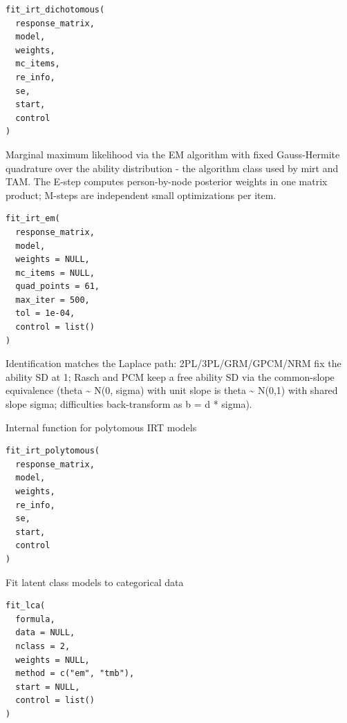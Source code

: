 \documentclass[a4paper]{book}
\begin{document}
%
\begin{Usage}
\begin{verbatim}
fit_irt_dichotomous(
  response_matrix,
  model,
  weights,
  mc_items,
  re_info,
  se,
  start,
  control
)
\end{verbatim}
\end{Usage}
%
\begin{Description}
Marginal maximum likelihood via the EM algorithm with fixed Gauss-Hermite
quadrature over the ability distribution - the algorithm class used by
mirt and TAM. The E-step computes person-by-node posterior weights in one
matrix product; M-steps are independent small optimizations per item.
\end{Description}
%
\begin{Usage}
\begin{verbatim}
fit_irt_em(
  response_matrix,
  model,
  weights = NULL,
  mc_items = NULL,
  quad_points = 61,
  max_iter = 500,
  tol = 1e-04,
  control = list()
)
\end{verbatim}
\end{Usage}
%
\begin{Details}
Identification matches the Laplace path: 2PL/3PL/GRM/GPCM/NRM fix the
ability SD at 1; Rasch and PCM keep a free ability SD via the
common-slope equivalence (theta \textasciitilde{} N(0, sigma) with unit slope is
theta \textasciitilde{} N(0,1) with shared slope sigma; difficulties back-transform as
b = d * sigma).
\end{Details}
%
\begin{Description}
Internal function for polytomous IRT models
\end{Description}
%
\begin{Usage}
\begin{verbatim}
fit_irt_polytomous(
  response_matrix,
  model,
  weights,
  re_info,
  se,
  start,
  control
)
\end{verbatim}
\end{Usage}
%
\begin{Description}
Fit latent class models to categorical data
\end{Description}
%
\begin{Usage}
\begin{verbatim}
fit_lca(
  formula,
  data = NULL,
  nclass = 2,
  weights = NULL,
  method = c("em", "tmb"),
  start = NULL,
  control = list()
)
\end{verbatim}
\end{Usage}
\end{document}
